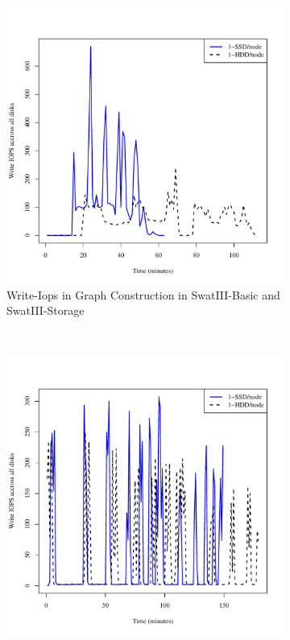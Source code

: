 \documentclass[conference]{IEEEtran}
\begin{document}
\begin{figure}[H]
        \begin{subfigure}[b]{0.2\textwidth}
                \includegraphics[width=\textwidth]{Figure/SystemData/Plots/BGHddSsdWrIops.pdf}
                \caption{Write-Iops in Graph Construction in SwatIII-Basic and SwatIII-Storage}
                \label{fig:BGHddSsdWrIops}
        \end{subfigure}
        ~ %
        \begin{subfigure}[b]{0.2\textwidth}
                \includegraphics[width=\textwidth]{Figure/SystemData/Plots/ECHddSsdWrIops.pdf}

\end{subfigure}
\end{figure}
\end{document}
